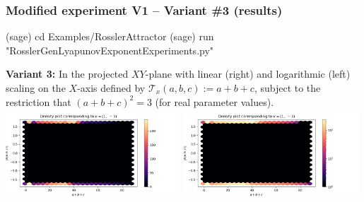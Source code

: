 \documentclass[usenames,svgnames,dvipsnames,10pt]{beamer}
\begin{document}
\begin{frame}[fragile]
\frametitle{Modified experiment V1 -- Variant \#3 (results)}

\begin{center}
\begin{code}
(sage) cd Examples/RosslerAttractor
(sage) run "RosslerGenLyapunovExponentExperiments.py"
\end{code}
\textbf{Variant 3:} 
In the projected $XY$-plane with linear (right) and logarithmic (left) scaling on the $X$-axis defined by 
$\mathcal{T}_x(a, b, c) := a + b + c$, subject to the restriction that 
$(a+b+c)^2 = 3$ (for real parameter values). \\ 
\includegraphics[width=0.49\textwidth]{../Images/RosslerAttractorExpt1-Variant3-linearscale-TypeXY-2021-10-27-042004.png}
\includegraphics[width=0.49\textwidth]{../Images/RosslerAttractorExpt1-Variant3-logscale-TypeXY-2021-10-27-033310.png}
\end{center}

\end{frame}
\end{document}
